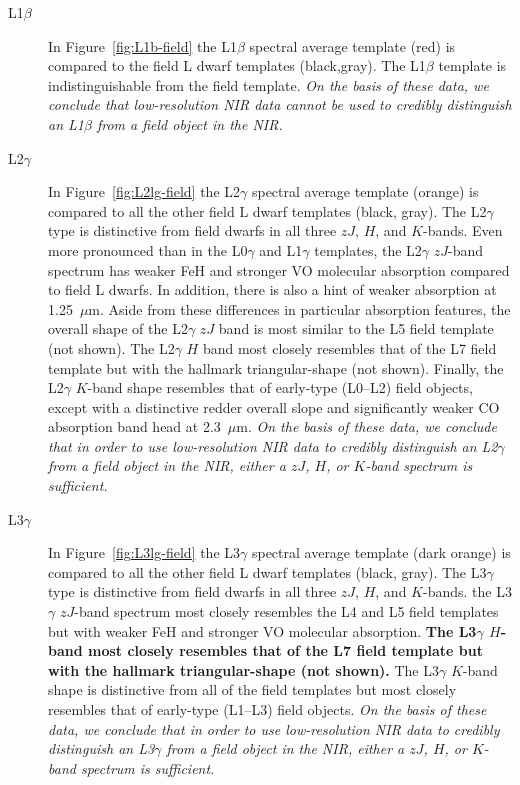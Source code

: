 \documentclass[12pt,preprint]{aastex}
\begin{document}
\begin{description}
\item[L1$\beta$]{
In Figure~\ref{fig:L1b-field} the L1$\beta$ spectral average template (red) is compared to the field L dwarf templates (black,gray). The L1$\beta$ template is indistinguishable from the field template.
\emph{On the basis of these data, we conclude that low-resolution NIR data cannot be used to credibly distinguish an L1$\beta$ from a field object in the NIR.}
}

\item[L2$\gamma$]{
In Figure~\ref{fig:L2lg-field} the L2$\gamma$ spectral average template (orange) is compared to all the other field L dwarf templates (black, gray).
The L2$\gamma$ type is distinctive from field dwarfs in all three $zJ$, $H$, and $K$-bands.
Even more pronounced than in the L0$\gamma$ and L1$\gamma$ templates, the L2$\gamma$ $zJ$-band spectrum has weaker FeH and stronger VO molecular absorption compared to field L dwarfs.
In addition, there is also a hint of weaker  absorption at 1.25~$\mu$m. Aside from these differences in particular absorption features, the overall shape of the L2$\gamma$ $zJ$ band is most similar to the L5 field template (not shown).
The L2$\gamma$ $H$ band most closely resembles that of the L7 field template but with the hallmark  triangular-shape (not shown).
Finally, the L2$\gamma$ $K$-band shape resembles that of early-type (L0--L2) field objects, except with a distinctive redder overall slope and significantly weaker CO absorption band head at 2.3~$\mu$m.
\emph{On the basis of these data, we conclude that in order to use low-resolution NIR data to credibly distinguish an L2$\gamma$ from a field object in the NIR, either a $zJ$, $H$, or $K$-band spectrum is sufficient.}
}

\item[L3$\gamma$]{
In Figure~\ref{fig:L3lg-field} the L3$\gamma$ spectral average template (dark orange) is compared to all the other field L dwarf templates (black, gray).
The L3$\gamma$ type is distinctive from field dwarfs in all three $zJ$, $H$, and $K$-bands.
the L3$\gamma$ $zJ$-band spectrum most closely resembles the L4 and L5 field templates but with weaker FeH and stronger VO molecular absorption.
\textbf{The L3$\gamma$ $H$-band most closely resembles that of the L7 field template but with the hallmark  triangular-shape (not shown). }
The L3$\gamma$ $K$-band shape is distinctive from all of the field templates but most closely resembles that of early-type (L1--L3) field objects.
\emph{On the basis of these data, we conclude that in order to use low-resolution NIR data to credibly distinguish an L3$\gamma$ from a field object in the NIR, either a $zJ$, $H$, or $K$-band spectrum is sufficient.}
}


\end{description}
\end{document}
